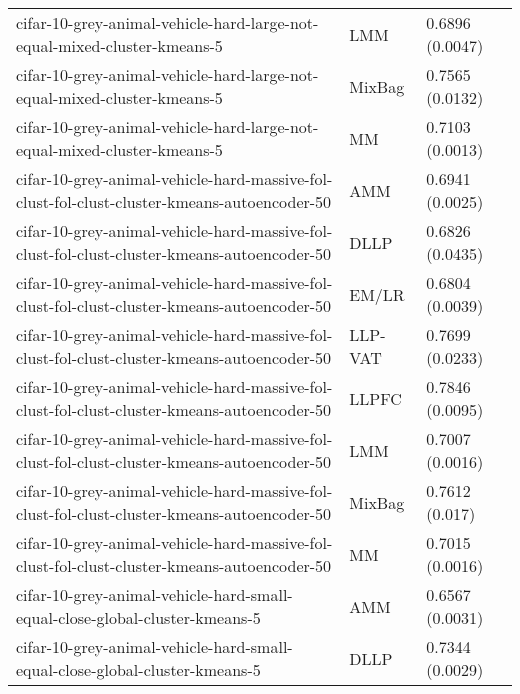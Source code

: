 \begin{longtable}{lll}
                                     cifar-10-grey-animal-vehicle-hard-large-not-equal-mixed-cluster-kmeans-5 &       LMM &                           0.6896 (0.0047) \\
                                     cifar-10-grey-animal-vehicle-hard-large-not-equal-mixed-cluster-kmeans-5 &    MixBag &                           0.7565 (0.0132) \\
                                     cifar-10-grey-animal-vehicle-hard-large-not-equal-mixed-cluster-kmeans-5 &        MM &                           0.7103 (0.0013) \\
                  cifar-10-grey-animal-vehicle-hard-massive-fol-clust-fol-clust-cluster-kmeans-autoencoder-50 &       AMM &                           0.6941 (0.0025) \\
                  cifar-10-grey-animal-vehicle-hard-massive-fol-clust-fol-clust-cluster-kmeans-autoencoder-50 &      DLLP &                           0.6826 (0.0435) \\
                  cifar-10-grey-animal-vehicle-hard-massive-fol-clust-fol-clust-cluster-kmeans-autoencoder-50 &     EM/LR &                           0.6804 (0.0039) \\
                  cifar-10-grey-animal-vehicle-hard-massive-fol-clust-fol-clust-cluster-kmeans-autoencoder-50 &   LLP-VAT &                           0.7699 (0.0233) \\
                  cifar-10-grey-animal-vehicle-hard-massive-fol-clust-fol-clust-cluster-kmeans-autoencoder-50 &     LLPFC &                           0.7846 (0.0095) \\
                  cifar-10-grey-animal-vehicle-hard-massive-fol-clust-fol-clust-cluster-kmeans-autoencoder-50 &       LMM &                           0.7007 (0.0016) \\
                  cifar-10-grey-animal-vehicle-hard-massive-fol-clust-fol-clust-cluster-kmeans-autoencoder-50 &    MixBag &                            0.7612 (0.017) \\
                  cifar-10-grey-animal-vehicle-hard-massive-fol-clust-fol-clust-cluster-kmeans-autoencoder-50 &        MM &                           0.7015 (0.0016) \\
                                  cifar-10-grey-animal-vehicle-hard-small-equal-close-global-cluster-kmeans-5 &       AMM &                           0.6567 (0.0031) \\
                                  cifar-10-grey-animal-vehicle-hard-small-equal-close-global-cluster-kmeans-5 &      DLLP &                           0.7344 (0.0029) \\

\end{longtable}
